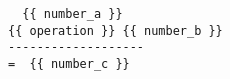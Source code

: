 \begin{verbatim}
  {{ number_a }}
{{ operation }} {{ number_b }}
-------------------
=  {{ number_c }}
\end{verbatim}
